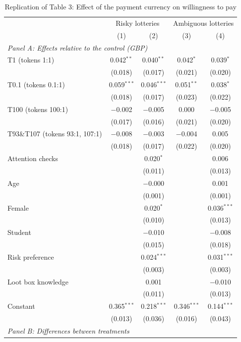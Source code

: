\begin{table}[!t]
\centering\footnotesize\renewcommand{\arraystretch}{0.92}
\caption{Replication of Table 3: Effect of the payment currency on willingness to pay}
\label{tab:replication}
\begin{tabular}{lcccc}
\toprule
 & \multicolumn{2}{c}{Risky lotteries} & \multicolumn{2}{c}{Ambiguous lotteries} \\
 & (1) & (2) & (3) & (4) \\
\midrule
\multicolumn{5}{l}{\emph{Panel A: Effects relative to the control (GBP)}} \\
T1 (tokens 1:1) & 0.042$^{**}$ & 0.040$^{**}$ & 0.042$^{*}$ & 0.039$^{*}$ \\
 & (0.018) & (0.017) & (0.021) & (0.020) \\
T0.1 (tokens 0.1:1) & 0.059$^{***}$ & 0.046$^{***}$ & 0.051$^{**}$ & 0.038$^{*}$ \\
 & (0.018) & (0.017) & (0.023) & (0.022) \\
T100 (tokens 100:1) & $-$0.002 & $-$0.005 & 0.000 & $-$0.005 \\
 & (0.017) & (0.016) & (0.021) & (0.020) \\
T93\&T107 (tokens 93:1, 107:1) & $-$0.008 & $-$0.003 & $-$0.004 & 0.005 \\
 & (0.018) & (0.017) & (0.022) & (0.020) \\
Attention checks &  & 0.020$^{*}$ &  & 0.006 \\
 &  & (0.011) &  & (0.013) \\
Age &  & $-$0.000 &  & 0.001 \\
 &  & (0.001) &  & (0.001) \\
Female &  & 0.020$^{*}$ &  & 0.036$^{***}$ \\
 &  & (0.010) &  & (0.013) \\
Student &  & $-$0.010 &  & $-$0.008 \\
 &  & (0.015) &  & (0.018) \\
Risk preference &  & 0.024$^{***}$ &  & 0.031$^{***}$ \\
 &  & (0.003) &  & (0.003) \\
Loot box knowledge &  & 0.001 &  & $-$0.010 \\
 &  & (0.011) &  & (0.013) \\
Constant & 0.365$^{***}$ & 0.218$^{***}$ & 0.346$^{***}$ & 0.144$^{***}$ \\
 & (0.013) & (0.036) & (0.016) & (0.043) \\
\midrule
\multicolumn{5}{l}{\emph{Panel B: Differences between treatments}} \\

\end{tabular}
\end{table}
